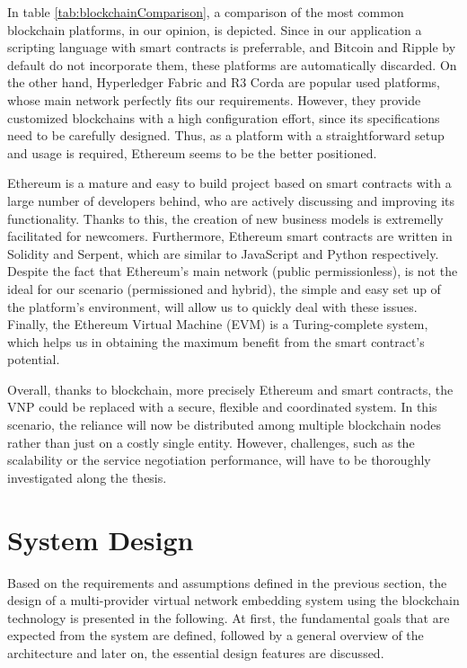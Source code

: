 In table \ref{tab:blockchainComparison}, a comparison of the most common blockchain platforms, in our opinion, is depicted. Since in our application a scripting language with smart contracts is preferrable, and Bitcoin and Ripple by default do not incorporate them, these platforms are automatically discarded. On the other hand, Hyperledger Fabric and R3 Corda are popular used platforms, whose main network perfectly fits our requirements. However, they provide customized blockchains with a high configuration effort, since its specifications need to be carefully designed. Thus, as a platform with a straightforward setup and usage is required, Ethereum seems to be the better positioned.

Ethereum is a mature and easy to build project based on smart contracts with a large number of developers behind, who are actively discussing and improving its functionality. Thanks to this, the creation of new business models is extremelly facilitated for newcomers. Furthermore, Ethereum smart contracts are written in Solidity and Serpent, which are similar to JavaScript and Python respectively. Despite the fact that Ethereum's main network (public permissionless), is not the ideal for our scenario (permissioned and hybrid), the simple and easy set up of the platform's environment, will allow us to quickly deal with these issues. Finally, the Ethereum Virtual Machine (EVM) is a Turing-complete system, which helps us in obtaining the maximum benefit from the smart contract's potential.

Overall, thanks to blockchain, more precisely Ethereum and smart contracts, the VNP could be replaced with a secure, flexible and coordinated system. In this scenario, the reliance will now be distributed among multiple blockchain nodes rather than just on a costly single entity. However, challenges, such as the scalability or the service negotiation performance, will have to be thoroughly investigated along the thesis.

\section{System Design}

Based on the requirements and assumptions defined in the previous section, the design of a multi-provider virtual network embedding system using the blockchain technology is presented in the following. At first, the fundamental goals that are expected from the system are defined, followed by a general overview of the architecture and later on, the essential design features are discussed.

